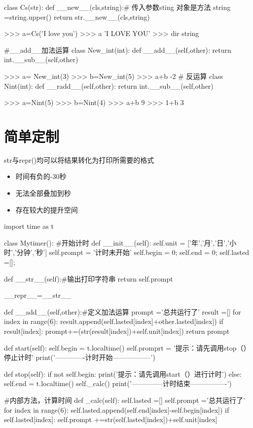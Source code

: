 \documentclass[a4paper,10pt]{ctexart}
\begin{document}
\begin{python}
class Cs(str):
	def __new__(cls,string):# 传入参数sting  对象是方法
		string =string.upper()
		return str.__new__(cls,string)

>>> a=Cs('I love you')
>>> a
'I LOVE YOU'
>>> dir string
\end{python}

\begin{python}
#__add__加法运算
class New_int(int):
	def __add__(self,other):
		return int.__sub__(self,other)

>>> a= New_int(3)
>>> b=New_int(5)
>>> a+b
-2
# 反运算
class Nint(int):
	def __radd__(self,other):
		return int.__sub__(self,other)

>>> a=Nint(5)
>>> b=Nint(4)
>>> a+b
9
>>> 1+b
3
\end{python}


\section{简单定制}
str与repr()均可以将结果转化为打印所需要的格式
\begin{itemize}
  \item 时间有负的-30秒
  \item 无法全部叠加到秒
  \item 存在较大的提升空间
\end{itemize}
\begin{python}
import time as t

class Mytimer():
    #开始计时
    def __init__(self):
        self.unit = ['年','月','日','小时','分钟','秒']
        self.prompt = '计时未开始'
        self.begin = 0;
        self.end = 0;
        self.lasted =[];

    def __str__(self):#输出打印字符串
        return self.prompt

    __repr__=__str__

    def __add__(self,other):#定义加法运算
        prompt ='总共运行了'
        result =[]
        for index in range(6):
            result.append(self.lasted[index]+other.lasted[index])
            if result[index]:
                prompt+=(str(result[index])+self.unit[index])
        return prompt

    def start(self):
        self.begin = t.localtime()
        self.promprt = '提示：请先调用stop（）停止计时'
        print('-------------计时开始-----------------')

    def stop(self):
        if not self.begin:
            print('提示：请先调用start（）进行计时')
        else:
            self.end = t.localtime()
            self._calc()
            print('--------------计时结束----------------')

    #内部方法，计算时间
    def _calc(self):
        self.lasted =[]
        self.prompt ='总共运行了'
        for index in range(6):
            self.lasted.append(self.end[index]-self.begin[index])
            if self.lasted[index]:
                self.prompt +=str(self.lasted[index])+self.unit[index]
\end{python}
\end{document}
